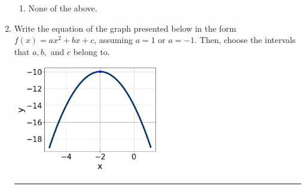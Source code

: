 \documentclass[14pt]{extbook}
\newcommand{\litem}[1]{\item#1\hspace*{-1cm}\rule{\textwidth}{0.4pt}}
\begin{document}
\begin{enumerate}
{\begin{enumerate}[label=\Alph*.]
\item None of the above.
\end{enumerate} }
\litem{
Write the equation of the graph presented below in the form $f(x)=ax^2+bx+c$, assuming  $a=1$ or $a=-1$. Then, choose the intervals that $a, b,$ and $c$ belong to.
\begin{center}
    \includegraphics[width=0.5\textwidth]{../Figures/quadraticGraphToEquationA.png}

\end{center}}
\end{enumerate}
\end{document}
